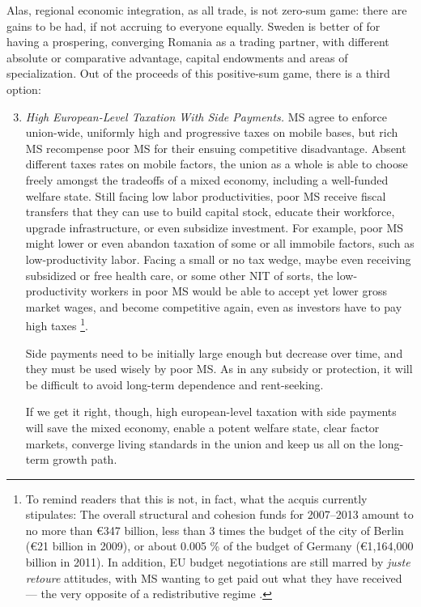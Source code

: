 \documentclass[11pt,a4paper,oneside]{article}
\begin{document}
Alas, regional economic integration, as all trade, is not zero-sum game: 
there are gains to be had, if not accruing to everyone equally. 
Sweden is better of for having a prospering, converging Romania as a trading partner, with different absolute or comparative advantage, capital endowments and areas of specialization. 
Out of the proceeds of this positive-sum game, there is a third option:
\begin{enumerate}
	\setcounter{enumi}{2}
	\item \emph{High European-Level Taxation With Side Payments.} \gls{MS} agree to enforce union-wide, uniformly high and progressive taxes on mobile bases, but rich \gls{MS} recompense poor \gls{MS} for their ensuing competitive disadvantage. 
	Absent different taxes rates on mobile factors, the union as a whole is able to choose freely amongst the tradeoffs of a mixed economy, including a well-funded welfare state. 
	Still facing low labor productivities, poor \gls{MS} receive fiscal transfers that they can use to build capital stock, educate their workforce, upgrade infrastructure, or even subsidize investment. 
	For example, poor \gls{MS} might lower or even abandon taxation of some or all immobile factors, such as low-productivity labor. 
	Facing a small or no tax wedge, maybe even receiving subsidized or free health care, or some other \gls{NIT} of sorts, the low-productivity workers in poor \gls{MS} would be able to accept yet lower gross market wages, and become competitive again, even as investors have to pay high taxes
	\footnote{
		To remind readers that this is not, in fact, what the acquis currently stipulates: 
		The overall structural and cohesion funds for 2007--2013 amount to no more than \euro 347 billion, less than 3 times the budget of the city of Berlin (\euro 21 billion in 2009), or about 0.005 \% of the budget of Germany (\euro 1,164,000 billion in 2011). 
		In addition, \gls{EU} budget negotiations are still marred by \emph{juste retoure} attitudes, with \gls{MS} wanting to get paid out what they have received --- the very opposite of a redistributive regime \citep[e.g.][]{Begg2008a}.
	}.
	
	Side payments need to be initially large enough but decrease over time, and they must be used wisely by poor \gls{MS}. 
	As in any subsidy or  protection, it will be difficult to avoid long-term dependence and rent-seeking.
	
	If we get it right, though, high european-level taxation with side payments will save the mixed economy, enable a potent welfare state, clear factor markets, converge living standards in the union and keep us all on the long-term growth path. 
\end{enumerate}
\end{document}
